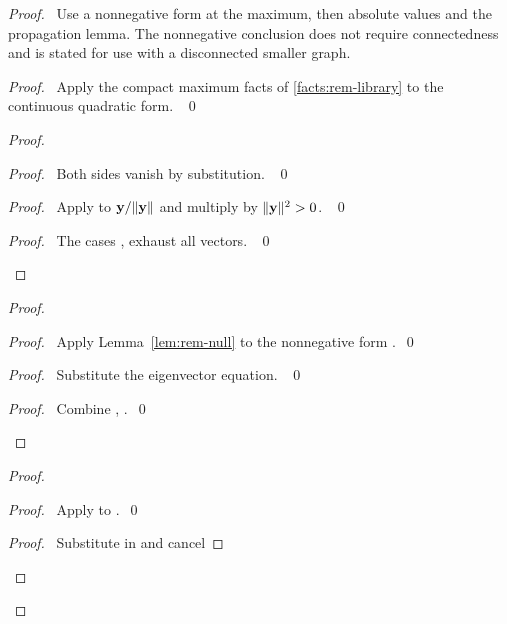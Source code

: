 \begin{proof}
\pfsketch\ Use a nonnegative form at the maximum, then absolute values
and the propagation lemma. The nonnegative conclusion does not require
connectedness and is stated for use with a disconnected smaller graph.
\begin{proof}\pf\ Apply the compact maximum facts of
\ref{facts:rem-library} to the continuous quadratic form. ~\qed\end{proof}
\begin{proof}
\begin{proof}\pf\ Both sides vanish by substitution. ~\qed\end{proof}
\begin{proof}\pf\ Apply  to ${\mathbf y}/\|{\mathbf y}\|$ and multiply
by $\|{\mathbf y}\|^2>0$. ~\qed\end{proof}
\qedstep
\begin{proof}\pf\ The cases ,  exhaust
all vectors. ~\qed\end{proof}
\end{proof}
\begin{proof}
\begin{proof}\pf\ Apply Lemma~\ref{lem:rem-null} to the nonnegative form
.~\qed\end{proof}
\begin{proof}\pf\ Substitute the eigenvector equation. ~\qed\end{proof}
\qedstep
\begin{proof}\pf\ Combine , .~\qed\end{proof}
\end{proof}
\begin{proof}
\begin{proof}\pf\ Apply  to .~\qed\end{proof}
\begin{proof}\pf\ Substitute in  and cancel

\end{proof}
\end{proof}
\end{proof}

